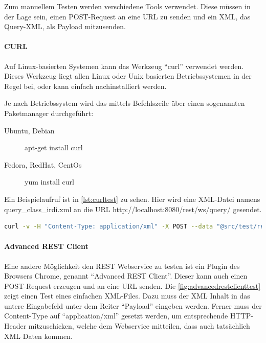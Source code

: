 Zum manuellem Testen werden verschiedene Tools verwendet. Diese müssen in der Lage sein, einen POST-Request an eine URL zu senden und ein XML, das Query-XML, als Payload mitzusenden.

\paragraph{CURL}

Auf Linux-basierten Systemen kann das Werkzeug \enquote{curl} verwendet werden. Dieses Werkzeug liegt allen Linux oder Unix basierten Betriebssystemen in der Regel bei, oder kann einfach nachinstalliert werden. 

Je nach Betriebssystem wird das mittels Befehlszeile über einen sogenannten Paketmanager durchgeführt:
\begin{description}
\item[Ubuntu, Debian] apt-get install curl
\item[Fedora, RedHat, CentOs] yum install curl
\end{description}

Ein Beispielaufruf ist in \autoref{lst:curltest} zu sehen. Hier wird eine XML-Datei namens query\_class\_irdi.xml an die URL http://localhost:8080/rest/ws/query/ gesendet. 

\begin{lstlisting}[caption=CURL Test des REST Webservices, language=sh, label=lst:curltest]
curl -v -H "Content-Type: application/xml" -X POST --data "@src/test/resources/de/feu/plib/xml/query_class_irdi.xml" http://localhost:8080/rest/ws/query
 \end{lstlisting}   

\paragraph{Advanced REST Client} 

Eine andere Möglichkeit den \gls{REST} Webservice zu testen ist ein Plugin des Browsers Chrome, genannt \enquote{Advanced REST Client}. Dieser kann auch einen POST-Request erzeugen und an eine URL senden. Die \autoref{fig:advancedrestclienttest} zeigt einen Test eines einfachen XML-Files. Dazu muss der XML Inhalt in das untere Eingabefeld unter dem Reiter \enquote{Payload} eingeben werden. Ferner muss der Content-Type auf \enquote{application/xml} gesetzt werden, um entsprechende HTTP-Header mitzuschicken, welche dem Webservice mitteilen, dass auch tatsächlich XML Daten kommen. 

